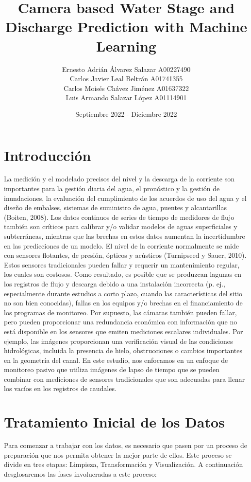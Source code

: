 \documentclass{article}
\title{Camera based Water Stage and Discharge Prediction with Machine Learning}
\author{
Ernesto Adrián Álvarez Salazar  A00227490\\
Carlos Javier Leal Beltrán  A01741355\\
Carlos Moisés Chávez Jiménez  A01637322\\
Luis Armando Salazar López  A01114901\\
}
\date{Septiembre 2022 - Diciembre 2022}
\begin{document}
\maketitle

\section{Introducción}

La medición y el modelado precisos del nivel y la descarga de la corriente son importantes para la gestión diaria del agua, el pronóstico y la gestión de inundaciones, la evaluación del cumplimiento de los acuerdos de uso del agua y el diseño de embalses, sistemas de suministro de agua, puentes y alcantarillas (Boiten, 2008). Los datos continuos de series de tiempo de medidores de flujo también son críticos para calibrar y/o validar modelos de aguas superficiales y subterráneas, mientras que las brechas en estos datos aumentan la incertidumbre en las predicciones de un modelo.  El nivel de la corriente normalmente se mide con sensores flotantes, de presión, ópticos y acústicos (Turnipseed y Sauer, 2010).  Estos sensores tradicionales pueden fallar y requerir un mantenimiento regular, los cuales son costosos.  Como resultado, es posible que se produzcan lagunas en los registros de flujo y descarga debido a una instalación incorrecta (p. ej., especialmente durante estudios a corto plazo, cuando las características del sitio no son bien conocidas), fallas en los equipos y/o brechas en el financiamiento de los programas de monitoreo.  Por supuesto, las cámaras también pueden fallar, pero pueden proporcionar una redundancia económica con información que no está disponible en los sensores que emiten mediciones escalares individuales.  Por ejemplo, las imágenes proporcionan una verificación visual de las condiciones hidrológicas, incluida la presencia de hielo, obstrucciones o cambios importantes en la geometría del canal.  En este estudio, nos enfocamos en un enfoque de monitoreo pasivo que utiliza imágenes de lapso de tiempo que se pueden combinar con mediciones de sensores tradicionales que son adecuadas para llenar los vacíos en los registros de caudales.



\section{Tratamiento Inicial de los Datos}

Para comenzar a trabajar con los datos, es necesario que pasen por un proceso de preparación que nos permita obtener la mejor parte de ellos. Este proceso se divide en tres etapas: Limpieza, Transformación y Visualización. A continuación desglosaremos las fases involucradas a este proceso:
\end{document}
